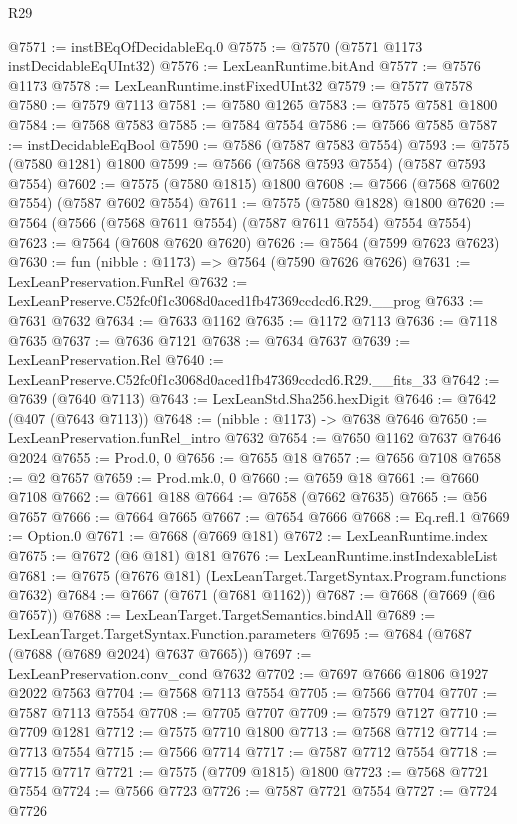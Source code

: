 \begin{lexlean}{R29}
\begin{coremodule}
@7571 := instBEqOfDecidableEq.{0}
@7575 := @7570 (@7571 @1173 instDecidableEqUInt32)
@7576 := LexLeanRuntime.bitAnd
@7577 := @7576 @1173
@7578 := LexLeanRuntime.instFixedUInt32
@7579 := @7577 @7578
@7580 := @7579 @7113
@7581 := @7580 @1265
@7583 := @7575 @7581 @1800
@7584 := @7568 @7583
@7585 := @7584 @7554
@7586 := @7566 @7585
@7587 := instDecidableEqBool
@7590 := @7586 (@7587 @7583 @7554)
@7593 := @7575 (@7580 @1281) @1800
@7599 := @7566 (@7568 @7593 @7554) (@7587 @7593 @7554)
@7602 := @7575 (@7580 @1815) @1800
@7608 := @7566 (@7568 @7602 @7554) (@7587 @7602 @7554)
@7611 := @7575 (@7580 @1828) @1800
@7620 := @7564 (@7566 (@7568 @7611 @7554) (@7587 @7611 @7554) @7554 @7554)
@7623 := @7564 (@7608 @7620 @7620)
@7626 := @7564 (@7599 @7623 @7623)
@7630 := fun (nibble : @1173) => @7564 (@7590 @7626 @7626)
@7631 := LexLeanPreservation.FunRel
@7632 := LexLeanPreserve.C52fc0f1c3068d0aced1fb47369ccdcd6.R29.__prog
@7633 := @7631 @7632
@7634 := @7633 @1162
@7635 := @1172 @7113
@7636 := @7118 @7635
@7637 := @7636 @7121
@7638 := @7634 @7637
@7639 := LexLeanPreservation.Rel
@7640 := LexLeanPreserve.C52fc0f1c3068d0aced1fb47369ccdcd6.R29.__fits_33
@7642 := @7639 (@7640 @7113)
@7643 := LexLeanStd.Sha256.hexDigit
@7646 := @7642 (@407 (@7643 @7113))
@7648 := (nibble : @1173) -> @7638 @7646
@7650 := LexLeanPreservation.funRel_intro @7632
@7654 := @7650 @1162 @7637 @7646 @2024
@7655 := Prod.{0, 0}
@7656 := @7655 @18
@7657 := @7656 @7108
@7658 := @2 @7657
@7659 := Prod.mk.{0, 0}
@7660 := @7659 @18
@7661 := @7660 @7108
@7662 := @7661 @188
@7664 := @7658 (@7662 @7635)
@7665 := @56 @7657
@7666 := @7664 @7665
@7667 := @7654 @7666
@7668 := Eq.refl.{1}
@7669 := Option.{0}
@7671 := @7668 (@7669 @181)
@7672 := LexLeanRuntime.index
@7675 := @7672 (@6 @181) @181
@7676 := LexLeanRuntime.instIndexableList
@7681 := @7675 (@7676 @181) (LexLeanTarget.TargetSyntax.Program.functions @7632)
@7684 := @7667 (@7671 (@7681 @1162))
@7687 := @7668 (@7669 (@6 @7657))
@7688 := LexLeanTarget.TargetSemantics.bindAll
@7689 := LexLeanTarget.TargetSyntax.Function.parameters
@7695 := @7684 (@7687 (@7688 (@7689 @2024) @7637 @7665))
@7697 := LexLeanPreservation.conv_cond @7632
@7702 := @7697 @7666 @1806 @1927 @2022 @7563
@7704 := @7568 @7113 @7554
@7705 := @7566 @7704
@7707 := @7587 @7113 @7554
@7708 := @7705 @7707
@7709 := @7579 @7127
@7710 := @7709 @1281
@7712 := @7575 @7710 @1800
@7713 := @7568 @7712
@7714 := @7713 @7554
@7715 := @7566 @7714
@7717 := @7587 @7712 @7554
@7718 := @7715 @7717
@7721 := @7575 (@7709 @1815) @1800
@7723 := @7568 @7721 @7554
@7724 := @7566 @7723
@7726 := @7587 @7721 @7554
@7727 := @7724 @7726

\end{coremodule}
\end{lexlean}
